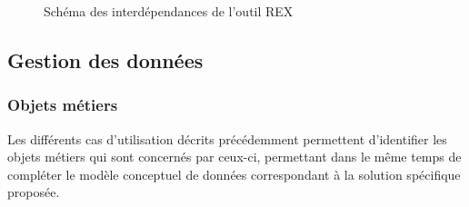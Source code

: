 \begin{figure}[H]
    \label{fig-dep-rex}
    \noindent{}
    \caption{Schéma des interdépendances de l'outil REX}
\end{figure}

\subsection{Gestion des données}

\subsubsection{Objets métiers}

Les différents cas d’utilisation décrits précédemment permettent d’identifier les objets métiers qui sont concernés par ceux-ci, permettant dans le même temps de compléter le modèle conceptuel de données correspondant à la solution spécifique proposée.

